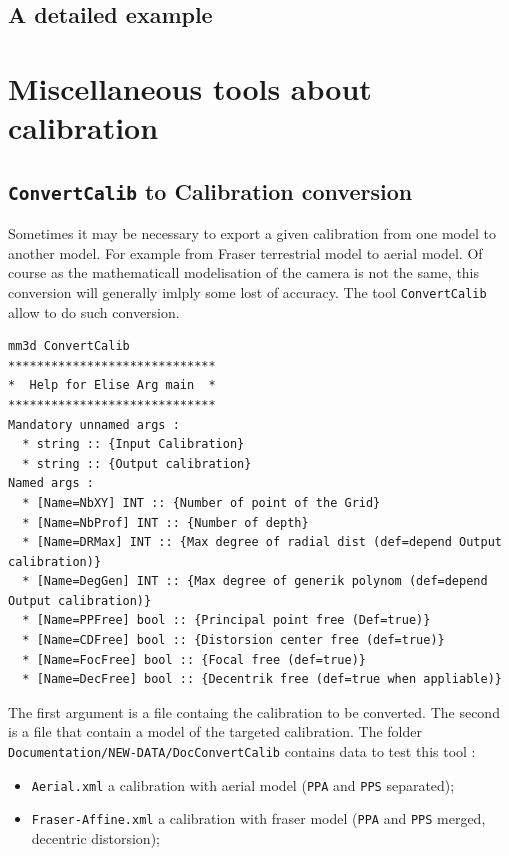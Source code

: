 \subsection{A detailed example}




\section{Miscellaneous  tools about calibration}


\subsection{{\tt ConvertCalib} to Calibration conversion}

Sometimes it may be necessary to export a given calibration from one model to another model. For example from Fraser terrestrial
model to aerial model. Of course as the mathematicall modelisation of the camera is not the same, this conversion will 
generally imlply some lost of accuracy.  The tool {\tt ConvertCalib} allow to do such conversion.

\begin{verbatim}
mm3d ConvertCalib
*****************************
*  Help for Elise Arg main  *
*****************************
Mandatory unnamed args : 
  * string :: {Input Calibration}
  * string :: {Output calibration}
Named args : 
  * [Name=NbXY] INT :: {Number of point of the Grid}
  * [Name=NbProf] INT :: {Number of depth}
  * [Name=DRMax] INT :: {Max degree of radial dist (def=depend Output calibration)}
  * [Name=DegGen] INT :: {Max degree of generik polynom (def=depend Output calibration)}
  * [Name=PPFree] bool :: {Principal point free (Def=true)}
  * [Name=CDFree] bool :: {Distorsion center free (def=true)}
  * [Name=FocFree] bool :: {Focal free (def=true)}
  * [Name=DecFree] bool :: {Decentrik free (def=true when appliable)}
\end{verbatim}


The first argument is a file containg the calibration to be converted. The second is a file that contain a model of the
targeted calibration. The folder {\tt Documentation/NEW-DATA/DocConvertCalib} contains data to test this tool :

\begin{itemize}
   \item  {\tt Aerial.xml} a calibration with aerial model ({\tt PPA} and {\tt PPS} separated);
   \item  {\tt Fraser-Affine.xml} a calibration with fraser model ({\tt PPA} and {\tt PPS} merged, decentric distorsion);
\end{itemize}

